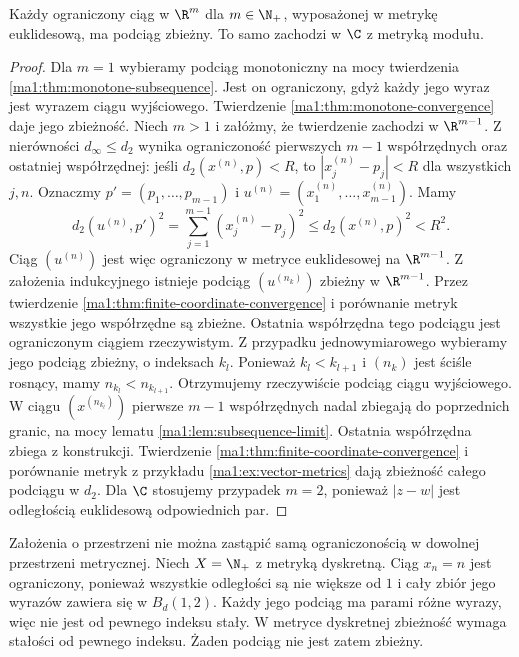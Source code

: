 \begin{twierdzenie}
\label{ma1:thm:bolzano-weierstrass}
Każdy ograniczony ciąg w $\R^m$ dla $m\in\N_+$, wyposażonej w metrykę euklidesową, ma podciąg zbieżny. To samo zachodzi w $\C$ z metryką modułu.
\end{twierdzenie}
\begin{proof}
Dla $m=1$ wybieramy podciąg monotoniczny na mocy twierdzenia \ref{ma1:thm:monotone-subsequence}. Jest on ograniczony, gdyż każdy jego wyraz jest wyrazem ciągu wyjściowego. Twierdzenie \ref{ma1:thm:monotone-convergence} daje jego zbieżność.
Niech $m>1$ i załóżmy, że twierdzenie zachodzi w $\R^{m-1}$. Z nierówności $d_\infty\le d_2$ wynika ograniczoność pierwszych $m-1$ współrzędnych oraz ostatniej współrzędnej: jeśli $d_2(x^{(n)},p)<R$, to $|x_j^{(n)}-p_j|<R$ dla wszystkich $j,n$. Oznaczmy $p'=(p_1,\ldots,p_{m-1})$ i $u^{(n)}=(x_1^{(n)},\ldots,x_{m-1}^{(n)})$. Mamy
\[
 d_2(u^{(n)},p')^2=\sum_{j=1}^{m-1}(x_j^{(n)}-p_j)^2
 \le d_2(x^{(n)},p)^2<R^2.
\]
Ciąg $(u^{(n)})$ jest więc ograniczony w metryce euklidesowej na $\R^{m-1}$. Z założenia indukcyjnego istnieje podciąg $(u^{(n_k)})$ zbieżny w $\R^{m-1}$. Przez twierdzenie \ref{ma1:thm:finite-coordinate-convergence} i porównanie metryk wszystkie jego współrzędne są zbieżne. Ostatnia współrzędna tego podciągu jest ograniczonym ciągiem rzeczywistym. Z przypadku jednowymiarowego wybieramy jego podciąg zbieżny, o indeksach $k_l$. Ponieważ $k_l<k_{l+1}$ i $(n_k)$ jest ściśle rosnący, mamy $n_{k_l}<n_{k_{l+1}}$. Otrzymujemy rzeczywiście podciąg ciągu wyjściowego. W ciągu $(x^{(n_{k_l})})$ pierwsze $m-1$ współrzędnych nadal zbiegają do poprzednich granic, na mocy lematu \ref{ma1:lem:subsequence-limit}. Ostatnia współrzędna zbiega z konstrukcji. Twierdzenie \ref{ma1:thm:finite-coordinate-convergence} i porównanie metryk z przykładu \ref{ma1:ex:vector-metrics} dają zbieżność całego podciągu w $d_2$. Dla $\C$ stosujemy przypadek $m=2$, ponieważ $|z-w|$ jest odległością euklidesową odpowiednich par.
\end{proof}
\begin{przyklad}
Założenia o przestrzeni nie można zastąpić samą ograniczonością w dowolnej przestrzeni metrycznej. Niech $X=\N_+$ z metryką dyskretną. Ciąg $x_n=n$ jest ograniczony, ponieważ wszystkie odległości są nie większe od $1$ i cały zbiór jego wyrazów zawiera się w $B_d(1,2)$. Każdy jego podciąg ma parami różne wyrazy, więc nie jest od pewnego indeksu stały. W metryce dyskretnej zbieżność wymaga stałości od pewnego indeksu. Żaden podciąg nie jest zatem zbieżny.
\end{przyklad}

